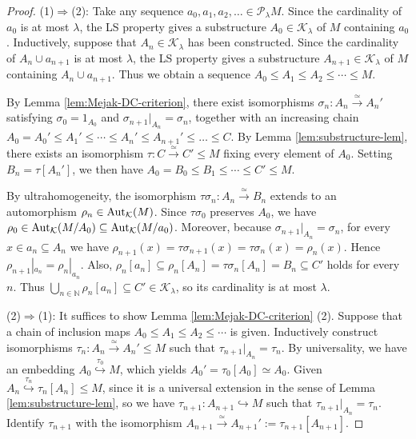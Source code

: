 \documentclass[10pt]{amsart}
\numberwithin{equation}{section}
\theoremstyle{plain}
\theoremstyle{definition}
\newcommand{\N}{\mathbb{N}}
\newcommand{\K}{\mathcal{K}}
\newcommand{\embed}{\hookrightarrow}
\newcommand{\edge}[1]{\overset{#1}{\longrightarrow}}
\newcommand{\embedge}[1]{\overset{#1}{\embed}}
\begin{document}
\begin{proof}
(1)$\Rightarrow$(2):
Take any sequence $a_0,a_1,a_2,\dots\in\mathcal{P}_\lambda M$.
Since the cardinality of $a_0$ is at most $\lambda$, the LS property gives a substructure $A_0\in\K_\lambda$ of $M$ containing $a_0$.
Inductively, suppose that $A_n\in\K_\lambda$ has been constructed.
Since the cardinality of $A_n\cup a_{n+1}$ is at most $\lambda$, the LS property gives a substructure $A_{n+1}\in\K_\lambda$ of $M$ containing $A_n\cup a_{n+1}$.
Thus we obtain a sequence $A_0\leq A_1\leq A_2\leq\cdots\leq M$.

By Lemma \ref{lem:Mejak-DC-criterion}, there exist isomorphisms $\sigma_n\colon A_{n}\edge{\simeq}A_{n}'$ satisfying $\sigma_0=1_{A_0}$ and $\sigma_{n+1}|_{A_n}=\sigma_{n}$, together with an increasing chain $A_0=A_0'\leq A_1'\leq \cdots\leq A_n'\leq A_{n+1}'\leq \dots\leq C$.
By Lemma \ref{lem:substructure-lem}, there exists an isomorphism $\tau\colon C\edge{\simeq}C'\leq M$ fixing every element of $A_0$.
Setting $B_n=\tau[A_n']$, we then have $A_0=B_0\leq B_1\leq\cdots\leq C'\leq M$.

By ultrahomogeneity, the isomorphism $\tau\sigma_n\colon A_{n}\edge{\simeq}B_{n}$ extends to an automorphism $\rho_n\in{\rm Aut}_\K(M)$.
Since $\tau\sigma_0$ preserves $A_0$, we have $\rho_0\in{\rm Aut}_\K(M/A_0)\subseteq{\rm Aut}_\K(M/a_0)$.
Moreover, because $\sigma_{n+1}|_{A_n}=\sigma_{n}$, for every $x\in a_n\subseteq A_n$ we have $\rho_{n+1}(x)=\tau\sigma_{n+1}(x)=\tau\sigma_n(x)=\rho_n(x)$.
Hence $\rho_{n+1}|_{a_n}=\rho_n|_{a_n}$.
Also, $\rho_n[a_n]\subseteq\rho_n[A_n]=\tau\sigma_n[A_n]=B_n\subseteq C'$ holds for every $n$.
Thus $\bigcup_{n\in\N}\rho_n[a_n]\subseteq C'\in\K_\lambda$, so its cardinality is at most $\lambda$.

(2)$\Rightarrow$(1):
It suffices to show Lemma \ref{lem:Mejak-DC-criterion} (2).
Suppose that a chain of inclusion maps $A_0\leq A_1\leq A_2\leq\cdots$ is given.
Inductively construct isomorphisms $\tau_n\colon A_n\edge{\simeq} A_n'\leq M$ such that $\tau_{n+1}|_{A_{n}}=\tau_n$.
By universality, we have an embedding $A_0\embedge{\tau_0} M$, which yields $A_0'=\tau_0[A_0]\simeq A_0$.
Given $A_n\embedge{\tau_n}\tau_n[A_n]\leq M$, since it is a universal extension in the sense of Lemma \ref{lem:substructure-lem}, so we have $\tau_{n+1}\colon A_{n+1}\embed M$ such that $\tau_{n+1}|_{A_n}=\tau_n$.
Identify $\tau_{n+1}$ with the isomorphism $A_{n+1}\edge{\simeq} A_{n+1}':=\tau_{n+1}[A_{n+1}]$.


\end{proof}
\end{document}
